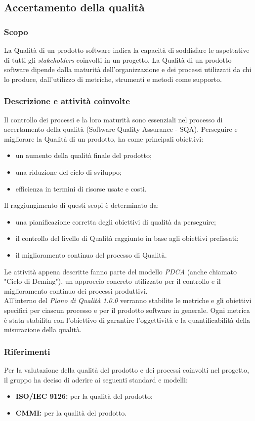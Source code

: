 \subsection{Accertamento della qualit\` a}
\subsubsection{Scopo}
La Qualità di un prodotto software indica la capacità di soddisfare le aspettative di tutti gli \textit{stakeholders\glo} coinvolti in un progetto.
La Qualità di un prodotto software dipende dalla maturità dell'organizzazione e dei processi utilizzati da chi lo produce, dall'utilizzo di metriche, strumenti e metodi come supporto.


\subsubsection{Descrizione e attività coinvolte}
Il controllo dei processi e la loro maturità sono essenziali nel processo di accertamento della qualità (Software Quality Assurance - SQA). 
Perseguire e migliorare la Qualità di un prodotto, ha come principali obiettivi:
\begin{itemize}
	\item un aumento della qualità finale del prodotto;
	\item una riduzione del ciclo di sviluppo;
	\item efficienza in termini di risorse usate e costi.
\end{itemize}
Il raggiungimento di questi scopi è determinato da:
\begin{itemize}
	\item una pianificazione corretta degli obiettivi di qualità da perseguire;
	\item il controllo del livello di Qualità raggiunto in base agli obiettivi prefissati;
	\item il miglioramento continuo del processo di Qualità.
\end{itemize}
Le attività appena descritte fanno parte del modello \textit{PDCA\glo} (anche chiamato "Ciclo di Deming"), un approccio concreto utilizzato per il controllo e il miglioramento continuo dei processi produttivi.\\
All'interno del \textit{Piano di Qualità 1.0.0\doc} verranno stabilite le metriche e gli obiettivi specifici per ciascun processo e per il prodotto software in generale. Ogni metrica è stata stabilita con l'obiettivo di garantire l'oggettività e la quantificabilità della misurazione della qualità.

\subsubsection{Riferimenti}
Per la valutazione della qualità del prodotto e dei processi coinvolti nel progetto, il gruppo ha deciso di aderire ai seguenti standard e modelli:
\begin{itemize}
	\item \textbf{ISO/IEC 9126:} per la qualità del prodotto;
	\item \textbf{CMMI:} per la qualità del prodotto.
\end{itemize}

